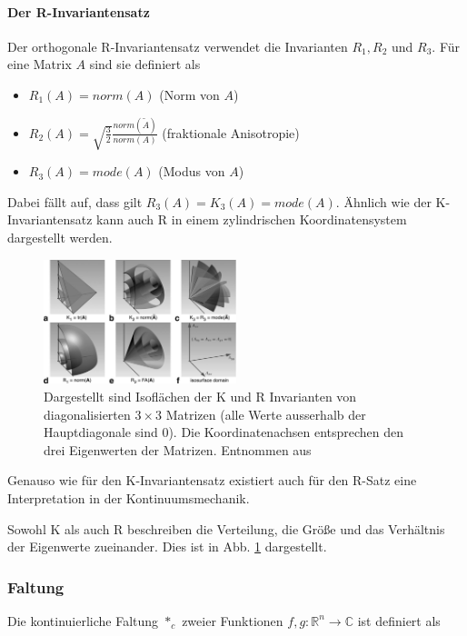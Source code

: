 \documentclass[a4paper,fontsize=12pt,toc=bib,halfparskip]{scrartcl}
\begin{document}
\paragraph{Der R-Invariantensatz}
Der orthogonale R-Invariantensatz verwendet die Invarianten $R_1, R_2$ und $R_3$. F\"ur eine Matrix $A$ sind sie definiert als

\begin{itemize}
	\item $R_1(A)=norm(A)$ (Norm von $A$)
	\item $R_2(A)=\sqrt{\frac{3}{2}} \frac{norm(\tilde{A})}{norm(A)}$ (fraktionale Anisotropie)
	\item $R_3(A)=mode(A)$ (Modus von $A$)
\end{itemize}

Dabei f\"allt auf, dass gilt $R_3(A) = K_3(A) = mode(A)$. \"Ahnlich wie der K-Invariantensatz kann auch R in einem zylindrischen Koordinatensystem dargestellt werden.

\begin{figure}
	\centering
	\includegraphics[width=0.5\textwidth]{pictures/000.png}
	\caption{Dargestellt sind Isofl\"achen der K und R Invarianten von diagonalisierten $3\times 3$ Matrizen (alle Werte ausserhalb der Hauptdiagonale sind 0). Die Koordinatenachsen entsprechen den drei Eigenwerten der Matrizen. Entnommen aus \cite[S.~139]{ennis2006orthogonal}}
	\label{KRInvariants}
\end{figure}

Genauso wie f\"ur den K-Invariantensatz existiert auch f\"ur den R-Satz eine Interpretation in der Kontinuumsmechanik. 

Sowohl K als auch R beschreiben die Verteilung, die Gr\"o{\ss}e und das Verh\"altnis der Eigenwerte zueinander. Dies ist in Abb. \ref{KRInvariants} dargestellt. 

\subsubsection{Faltung}
Die kontinuierliche Faltung $*_c$ zweier Funktionen $f,g:\mathbb{R}^n\rightarrow\mathbb{C}$ ist definiert als
\end{document}
